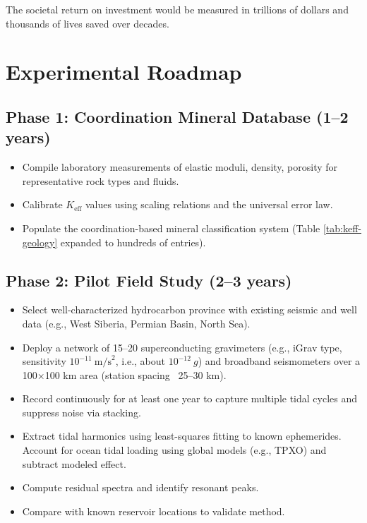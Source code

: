 \documentclass[12pt,a4paper]{article}
\theoremstyle{remark}
\newcommand{\Keff}{K_{\mathrm{eff}}}
\begin{document}
	The societal return on investment would be measured in trillions of dollars and thousands of lives saved over decades.
	
	\section{Experimental Roadmap}
	\label{sec:roadmap}
	
	\subsection{Phase 1: Coordination Mineral Database (1–2 years)}
	
	\begin{itemize}
		\item Compile laboratory measurements of elastic moduli, density, porosity for representative rock types and fluids.
		\item Calibrate $\Keff$ values using scaling relations and the universal error law.
		\item Populate the coordination-based mineral classification system (Table \ref{tab:keff-geology} expanded to hundreds of entries).
	\end{itemize}
	
	\subsection{Phase 2: Pilot Field Study (2–3 years)}
	
	\begin{itemize}
		\item Select well-characterized hydrocarbon province with existing seismic and well data (e.g., West Siberia, Permian Basin, North Sea).
		\item Deploy a network of 15–20 superconducting gravimeters (e.g., iGrav type, sensitivity \(10^{-11}\ \text{m/s}^2\), i.e., about \(10^{-12}\ g\)) and broadband seismometers over a 100×100 km area (station spacing ~25–30 km).
		\item Record continuously for at least one year to capture multiple tidal cycles and suppress noise via stacking.
		\item Extract tidal harmonics using least-squares fitting to known ephemerides. Account for ocean tidal loading using global models (e.g., TPXO) and subtract modeled effect.
		\item Compute residual spectra and identify resonant peaks.
		\item Compare with known reservoir locations to validate method.
	\end{itemize}
	
\end{document}
